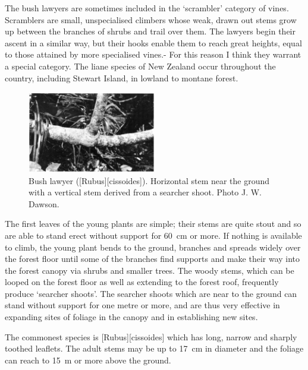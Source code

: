 The bush lawyers are sometimes included in the `scrambler' category of vines.
Scramblers are small, unspecialised climbers whose weak, drawn out stems grow up between the branches of shrubs and trail over them.
The lawyers begin their ascent in a similar way, but their hooks enable them to reach great heights, equal to those attained by more specialised vines.- For this reason I think they warrant a special category.
The liane species of New Zealand  occur throughout the country, including Stewart Island, in lowland to montane forest.

\begin{figure}
	\includegraphics[width=0.5\textwidth]{graphics/figure36bushlawyer.jpg}
	\centering
	\caption[Bush lawyer]{Bush lawyer ([Rubus][cissoides]).
	Horizontal stem near the ground with a vertical stem derived from a searcher shoot.
	Photo  J. W. Dawson.}%
	\label{fig:36bushlawyer}
\end{figure}

The first leaves of the young plants are simple; their stems are quite stout and so are able to stand erect without support for \SI{60}{\centi\metre} or more.
If nothing is available to climb, the young plant bends to the ground, branches and spreads widely over the forest floor until some of the branches find supports and make their way into the forest canopy via shrubs and smaller trees.
The woody stems, which can be looped on the forest floor as well as extending to the forest roof, frequently produce `searcher shoots'.
The searcher shoots which are near to the ground can stand without support for one metre or more, and are thus very effective in expanding sites of  foliage in the canopy and in establishing new sites.

The commonest species is [Rubus][cissoides] which has long, narrow and sharply toothed leaflets.
The adult stems may be up to \SI{17}{\centi\metre} in diameter and the foliage can reach to \SI{15}{\metre} or more above the ground.


